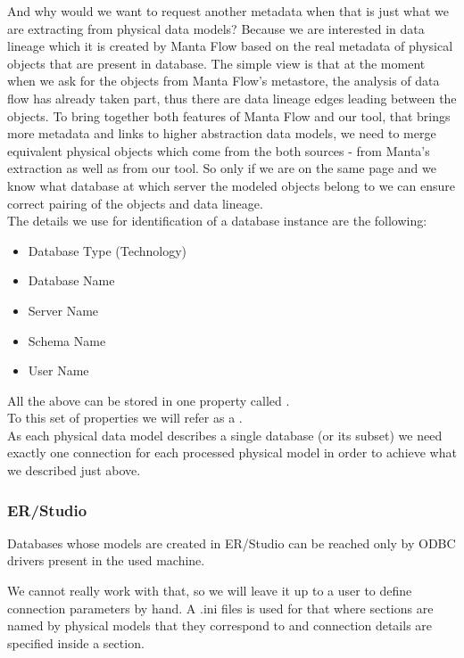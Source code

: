 And why would we want to request another metadata when that is just what we are extracting from physical data models? \label{matching_physical_objects}
Because we are interested in data lineage which it is created by Manta Flow based on the real metadata of physical objects that are present in database.
The simple view is that at the moment when we ask for the objects from Manta Flow's metastore, the analysis of data flow has already taken part, thus there are data lineage edges leading between the objects. To bring together both features of Manta Flow and our tool, that brings more metadata and links to higher abstraction data models, we need to merge equivalent physical objects which come from the both sources - from Manta's extraction as well as from our tool. 
So only if we are on the same page and we know what database at which server the modeled objects belong to we can ensure correct pairing of the objects and data lineage. \\

The details we use for identification of a database instance are the following:
\begin{itemize}
	\item Database Type (Technology)
	\item Database Name
	\item Server Name
	\item Schema Name
	\item User Name
\end{itemize} 
All the above can be stored in one property called .\\
To this set of properties we will refer as a . \\
As each physical data model describes a single database (or its subset) we need exactly one connection for each processed physical model in order to achieve what we described just above.

\subsubsection{ER/Studio}

Databases whose models are created in ER/Studio can be reached only by ODBC drivers present in the used machine.

We cannot really work with that, so we will leave it up to a user to define connection parameters by hand.
A .ini files \label{ini_connections}is used for that where sections are named by physical models that they correspond to and connection details are specified inside a section. 

